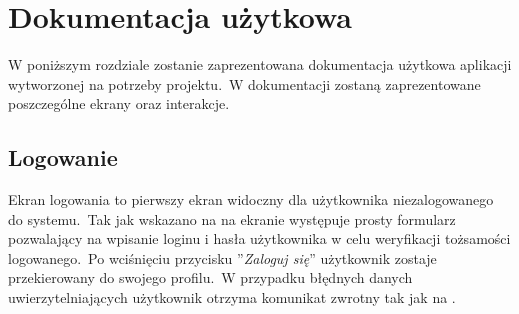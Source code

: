 \chapter{Dokumentacja użytkowa}
W poniższym rozdziale zostanie zaprezentowana dokumentacja użytkowa aplikacji wytworzonej na potrzeby projektu.\ W dokumentacji zostaną zaprezentowane poszczególne ekrany oraz interakcje.


\section{Logowanie}
Ekran logowania to pierwszy ekran widoczny dla użytkownika niezalogowanego do systemu.\ Tak jak wskazano na  na ekranie występuje prosty formularz pozwalający na wpisanie loginu i hasła użytkownika w celu weryfikacji tożsamości logowanego.\ Po wciśnięciu przycisku ''\textit{Zaloguj się}'' użytkownik zostaje przekierowany do swojego profilu.\ W przypadku błędnych danych uwierzytelniających użytkownik otrzyma komunikat zwrotny tak jak na .

